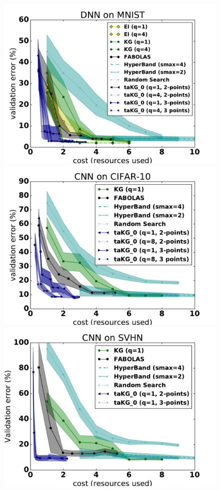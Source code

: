 \documentclass[letterpaper]{article}
\numberwithin{equation}{section}
\begin{document}
\begin{figure}[tb]
  \centering
  \subfigure
  \centering
  \includegraphics[width=\figwidth, height = \figheight]{fig/MNIST.pdf}
  \subfigure
  \centering
  \includegraphics[width=\figwidth, height = \figheight]{fig/CIFAR10.pdf}\\
  \subfigure
  \centering
  \includegraphics[width=\figwidth, height = \figheight]{fig/SVHN.pdf}

\end{figure}
\end{document}
